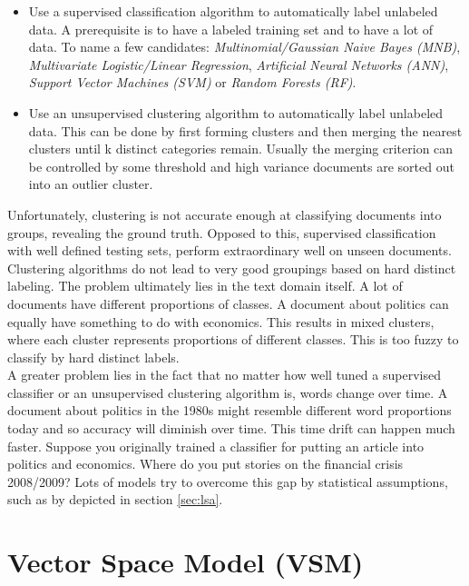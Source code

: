       \begin{itemize}
        \item Use a supervised classification algorithm to automatically label unlabeled data. A prerequisite is to have a labeled training set and to have a lot of data. To name a few candidates: \emph{Multinomial/Gaussian Naive Bayes (MNB)}, \emph{Multivariate Logistic/Linear Regression}, \emph{Artificial Neural Networks (ANN)}, \emph{Support Vector Machines (SVM)} or \emph{Random Forests (RF)}. \cite{BishopML}
        \item Use an unsupervised clustering algorithm to automatically label unlabeled data. This can be done by first forming clusters and then merging the nearest clusters until k distinct categories remain. Usually the merging criterion can be controlled by some threshold and high variance documents are sorted out into an outlier cluster.
      \end{itemize}

    Unfortunately, clustering is not accurate enough at classifying documents into groups, revealing the ground truth. Opposed to this, supervised classification with well defined testing sets, perform extraordinary well on unseen documents. Clustering algorithms do not lead to very good groupings based on hard distinct labeling. The problem ultimately lies in the text domain itself. A lot of documents have different proportions of classes. A document about politics can equally have something to do with economics. This results in mixed clusters, where each cluster represents proportions of different classes. This is too fuzzy to classify by hard distinct labels.\\

    A greater problem lies in the fact that no matter how well tuned a supervised classifier or an unsupervised clustering algorithm is, words change over time. A document about politics in the 1980s might resemble different word proportions today and so accuracy will diminish over time. This time drift can happen much faster. Suppose you originally trained a classifier for putting an article into politics and economics. Where do you put stories on the financial crisis 2008/2009? Lots of models try to overcome this gap by statistical assumptions, such as \lsa{} by \cite{DeerwesterLSI1990} depicted in section \ref{sec:lsa}.

\newpage{}
\section{Vector Space Model (VSM)}
\label{sec:vsm}

